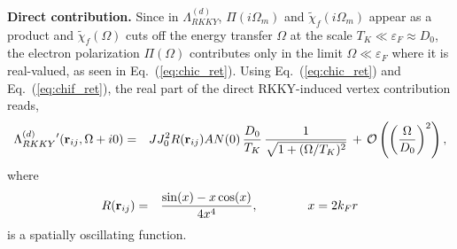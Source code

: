 \documentclass[12pt,twoside]{article}
\newcommand{\Eq}[1]{Eq.~(\ref{#1})}
\begin{document}
{\bf Direct contribution.}
Since in  $\Lambda^{(d)}_{RKKY}$, $\Pi(i\Omega_m)$ and 
$\tilde\chi_f(i\Omega_m)$ appear as a product and $\tilde\chi_f(\Omega)$ 
cuts off the energy transfer $\Omega$ at the 
scale $T_K\ll \varepsilon_F\approx D_0$, the electron polarization 
$\Pi(\Omega)$ contributes only in the limit $\Omega \ll \varepsilon_F$ 
where it is real-valued, as seen in \Eq{eq:chic_ret}. 
Using \Eq{eq:chic_ret} and \Eq{eq:chif_ret}, the real part of the 
direct RKKY-induced vertex contribution reads,
\begin{eqnarray}
\Lambda^{(d)}_{RKKY}{'}({\bf r}_{ij},\Omega+i0) &=& 
JJ_0^2  R({\bf r}_{ij}) A N(0) \, 
\frac{D_0}{T_K}\,\frac{1}{\sqrt{1+(\Omega/T_K)^2}} \, +\,
{\cal O}\left(\left(\frac{\Omega}{D_0}\right)^2\right),
\label{eq:Lambda_d1}
\end{eqnarray}
where   
\begin{eqnarray}   
R({\bf r}_{ij}) &=& \frac{\sin(x)-x\cos(x)}{4x^4}, \qquad\qquad x=2k_Fr
\end{eqnarray}   
is a spatially oscillating function.\\[0.3cm]
 
\end{document}
